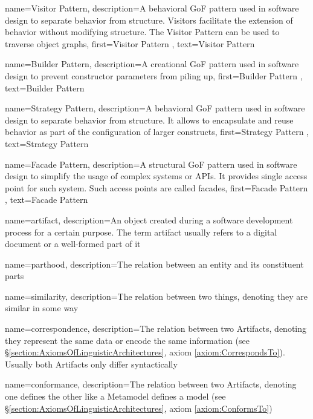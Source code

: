 {
    name={Visitor Pattern},
    description={A behavioral \gls{GoF} pattern used in software design to separate behavior from structure. Visitors facilitate the extension of behavior without modifying structure. The Visitor Pattern can be used to traverse object graphs},
    first={Visitor Pattern \cite{Gamma:1995:DPE:186897}},
    text={Visitor Pattern}
}

{
    name={Builder Pattern},
    description={A creational \gls{GoF} pattern used in software design to prevent constructor parameters from piling up},
    first={Builder Pattern \cite{Gamma:1995:DPE:186897}},
    text={Builder Pattern}
}

{
    name={Strategy Pattern},
    description={A behavioral \gls{GoF} pattern used in software design to separate behavior from structure. It allows to encapsulate and reuse behavior as part of the configuration of larger constructs},
    first={Strategy Pattern \cite{Gamma:1995:DPE:186897}},
    text={Strategy Pattern}
}

{
    name={Facade Pattern},
    description={A structural \gls{GoF} pattern used in software design to simplify the usage of complex systems or \glspl{API}. It provides single access point for such system. Such access points are called facades},
    first={Facade Pattern \cite{Gamma:1995:DPE:186897}},
    text={Facade Pattern}
}

{
    name={artifact},
    description={An object created during a software development process for a certain purpose. The term artifact usually refers to a digital document or a well-formed part of it}
}

{
    name={parthood},
    description={The relation between an entity and its constituent parts}
}

{
    name={similarity},
    description={The relation between two things, denoting they are similar in some way}
}

{
    name={correspondence},
    description={The relation between two \glspl{Artifact}, denoting they represent the same data or encode the same information (see §\ref{section:AxiomsOfLinguisticArchitectures}, axiom \ref{axiom:CorrespondsTo}). Usually both \glspl{Artifact} only differ syntactically}
}

{
    name={conformance},
    description={The relation between two \glspl{Artifact}, denoting one defines the other like a \gls{Metamodel} defines a model (see §\ref{section:AxiomsOfLinguisticArchitectures}, axiom \ref{axiom:ConformsTo})}
}

